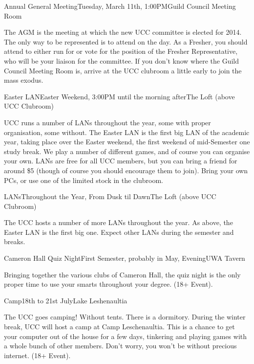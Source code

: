 \begin{event}{Annual General Meeting}{Tuesday, March 11th, 1:00PM}{Guild Council Meeting Room}

The AGM is the meeting at which the new UCC committee is elected for 2014. The only way to be represented is to attend on the day. As a Fresher, you should attend to either run for or vote for the position of the Fresher Representative, who will be your liaison for the committee. If you don't know where the Guild Council Meeting Room is, arrive at the UCC clubroom a little early to join the mass exodus.

\end{event}
\pagebreak
\begin{event}{Easter LAN}{Easter Weekend, 3:00PM until the morning after}{The Loft (above UCC Clubroom)}

UCC runs a number of LANs throughout the year, some with proper organisation, some without. The Easter LAN is the first big LAN of the academic year, taking place over the Easter weekend, the first weekend of mid-Semester one study break. We play a number of different games, and of course you can organise your own. LANs are free for all UCC members, but you can bring a friend for around \$5 (though of course you should encourage them to join). Bring your own PCs, or use one of the limited stock in the clubroom.

\end{event}


\begin{event}{LANs}{Throughout the Year, From Dusk til Dawn}{The Loft (above UCC Clubroom)}

The UCC hosts a number of more LANs throughout the year. As above, the Easter LAN is the first big one. Expect other LANs during the semester and breaks.

\end{event}

\begin{event}{Cameron Hall Quiz Night}{First Semester, probably in May, Evening}{UWA Tavern}

Bringing together the various clubs of Cameron Hall, the quiz night is the only proper time to use your smarts throughout your degree.  (18+ Event).

\end{event}


\begin{event}{Camp}{18th to 21st July}{Lake Leshenaultia}

The UCC goes camping! Without tents. There is a dormitory. During the winter break, UCC will host a camp at Camp Leschenaultia. This is a chance to get your computer out of the house for a few days, tinkering and playing games with a whole bunch of other members. Don't worry, you won't be without precious internet. (18+ Event).

\end{event}



